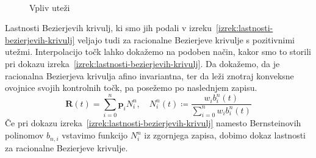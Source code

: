 \documentclass[isrm2, tisk]{fmfdelo}
\newcommand{\p}{\textbf{p}}
\begin{document}
    \begin{figure}[h]
        \centering
        \qquad
        \\
        \qquad
        \caption{Vpliv uteži}
        \label{fig:uteži}
    \end{figure}

    Lastnosti Bezierjevih krivulj, ki smo jih podali v izreku~\ref{izrek:lastnosti-bezierjevih-krivulj} veljajo tudi za racionalne Bezierjeve krivulje s pozitivnimi utežmi.
    Interpolacijo točk lahko dokažemo na podoben način, kakor smo to storili pri dokazu izreka~\ref{izrek:lastnosti-bezierjevih-krivulj}.
    Da dokažemo, da je racionalna Bezierjeva krivulja afino invariantna, ter da leži znotraj konveksne ovojnice svojih kontrolnih točk, pa posežemo po naslednjem zapisu.
    \[\mathbf{R}(t)=\sum^n_{i=0}\p_i N^n_i, \quad N^n_i(t)\coloneqq \frac{w_i b^n_i(t)}{\sum^n_{i=0}w_i b^n_i(t)}\]
    Če pri dokazu izreka~\ref{izrek:lastnosti-bezierjevih-krivulj} namesto Bernsteinovih polinomov $b_{n,i}$ vstavimo funkcijo $N^n_i$ iz zgornjega zapisa, dobimo dokaz lastnosti za racionalne Bezierjeve krivulje.
\end{document}
